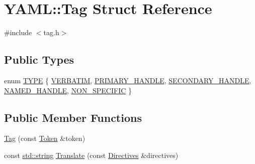 \hypertarget{struct_y_a_m_l_1_1_tag}{}\section{Y\+A\+ML\+::Tag Struct Reference}
\label{struct_y_a_m_l_1_1_tag}


{\ttfamily \#include $<$tag.\+h$>$}

\subsection*{Public Types}
\begin{DoxyCompactItemize}
\item 
enum \mbox{\hyperlink{struct_y_a_m_l_1_1_tag_a907531a31b340a01caa4b445ef988918}{T\+Y\+PE}} \{ \newline
\mbox{\hyperlink{struct_y_a_m_l_1_1_tag_a907531a31b340a01caa4b445ef988918aca1b262fdbf9b137f1936a6f46ed2a9a}{V\+E\+R\+B\+A\+T\+IM}}, 
\mbox{\hyperlink{struct_y_a_m_l_1_1_tag_a907531a31b340a01caa4b445ef988918adc37212094fa2fcbccff36563759c434}{P\+R\+I\+M\+A\+R\+Y\+\_\+\+H\+A\+N\+D\+LE}}, 
\mbox{\hyperlink{struct_y_a_m_l_1_1_tag_a907531a31b340a01caa4b445ef988918acb8f303cd2f13e0ab41b93b4ece8e0c3}{S\+E\+C\+O\+N\+D\+A\+R\+Y\+\_\+\+H\+A\+N\+D\+LE}}, 
\mbox{\hyperlink{struct_y_a_m_l_1_1_tag_a907531a31b340a01caa4b445ef988918acb759c372c2e169f5bfe3eb2f588e010}{N\+A\+M\+E\+D\+\_\+\+H\+A\+N\+D\+LE}}, 
\newline
\mbox{\hyperlink{struct_y_a_m_l_1_1_tag_a907531a31b340a01caa4b445ef988918ad003fe84b80bd639debf10ffe52d92ac}{N\+O\+N\+\_\+\+S\+P\+E\+C\+I\+F\+IC}}
 \}
\end{DoxyCompactItemize}
\subsection*{Public Member Functions}
\begin{DoxyCompactItemize}
\item 
\mbox{\hyperlink{struct_y_a_m_l_1_1_tag_abc1ec1f5f7a987fa6c0e6a53d41bd793}{Tag}} (const \mbox{\hyperlink{struct_y_a_m_l_1_1_token}{Token}} \&token)
\item 
const \mbox{\hyperlink{glad_8h_ac83513893df92266f79a515488701770}{std\+::string}} \mbox{\hyperlink{struct_y_a_m_l_1_1_tag_ac87f4b65dc65c3e6691111d6c7e8af3e}{Translate}} (const \mbox{\hyperlink{struct_y_a_m_l_1_1_directives}{Directives}} \&directives)
\end{DoxyCompactItemize}
